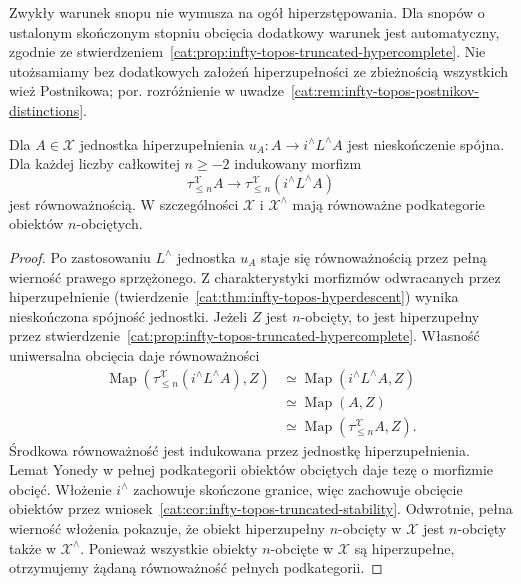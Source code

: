 Zwykły warunek snopu nie wymusza na ogół hiperzstępowania. Dla snopów o ustalonym skończonym stopniu obcięcia dodatkowy warunek jest automatyczny, zgodnie ze stwierdzeniem~\ref{cat:prop:infty-topos-truncated-hypercomplete}. Nie utożsamiamy bez dodatkowych założeń hiperzupełności ze zbieżnością wszystkich wież Postnikowa; por. rozróżnienie w uwadze~\ref{cat:rem:infty-topos-postnikov-distinctions}.

\begin{stwierdzenie}\label{cat:prop:infty-topos-hypercompletion-truncations}
Dla $A\in\mathcal X$ jednostka hiperzupełnienia $u_A:A\to i^\wedge L^\wedge A$ jest nieskończenie spójna. Dla każdej liczby całkowitej $n\geq-2$ indukowany morfizm
\[
 \tau_{\leq n}^{\mathcal X}A
 \longrightarrow
 \tau_{\leq n}^{\mathcal X}(i^\wedge L^\wedge A)
\]
jest równoważnością. W szczególności $\mathcal X$ i $\mathcal X^\wedge$ mają równoważne podkategorie obiektów $n$-obciętych.
\end{stwierdzenie}
\begin{proof}
Po zastosowaniu $L^\wedge$ jednostka $u_A$ staje się równoważnością przez pełną wierność prawego sprzężonego. Z charakterystyki morfizmów odwracanych przez hiperzupełnienie (twierdzenie~\ref{cat:thm:infty-topos-hyperdescent}) wynika nieskończona spójność jednostki. Jeżeli $Z$ jest $n$-obcięty, to jest hiperzupełny przez stwierdzenie~\ref{cat:prop:infty-topos-truncated-hypercomplete}. Własność uniwersalna obcięcia daje równoważności
\[
\begin{aligned}
 \operatorname{Map}(\tau_{\leq n}^{\mathcal X}(i^\wedge L^\wedge A),Z)
 &\simeq\operatorname{Map}(i^\wedge L^\wedge A,Z)\\
 &\simeq\operatorname{Map}(A,Z)\\
 &\simeq\operatorname{Map}(\tau_{\leq n}^{\mathcal X}A,Z).
\end{aligned}
\]
Środkowa równoważność jest indukowana przez jednostkę hiperzupełnienia. Lemat Yonedy w pełnej podkategorii obiektów obciętych daje tezę o morfizmie obcięć. Włożenie $i^\wedge$ zachowuje skończone granice, więc zachowuje obcięcie obiektów przez wniosek~\ref{cat:cor:infty-topos-truncated-stability}. Odwrotnie, pełna wierność włożenia pokazuje, że obiekt hiperzupełny $n$-obcięty w $\mathcal X$ jest $n$-obcięty także w $\mathcal X^\wedge$. Ponieważ wszystkie obiekty $n$-obcięte w $\mathcal X$ są hiperzupełne, otrzymujemy żądaną równoważność pełnych podkategorii.
\end{proof}

